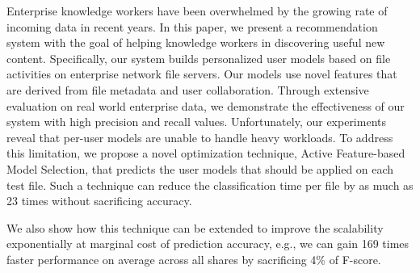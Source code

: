   Enterprise knowledge workers have been overwhelmed by the growing
  rate of incoming data in recent years.  In this paper, we present a
  recommendation system with the goal of helping knowledge workers in
  discovering useful new content.  Specifically, our system builds
  personalized user models based on file activities on enterprise
  network file servers.  Our models use novel features that are
  derived from file metadata and user collaboration.  Through
  extensive evaluation on real world enterprise data, we demonstrate
  the effectiveness of our system with high precision and recall
  values.  Unfortunately, our experiments reveal that per-user models
  are unable to handle heavy workloads.  To address this
  limitation, we propose a novel optimization technique, Active
  Feature-based Model Selection, that predicts the user models that 
should be applied on each test file. Such a technique can reduce the 
classification time per file by as much as 23 times without sacrificing accuracy. 

  We also show how this technique can be extended to improve the
  scalability exponentially at marginal cost of prediction accuracy, e.g., we can 
 gain 169 times faster performance on average across all shares by sacrificing 4\%
  of F-score.



 

 
% 



